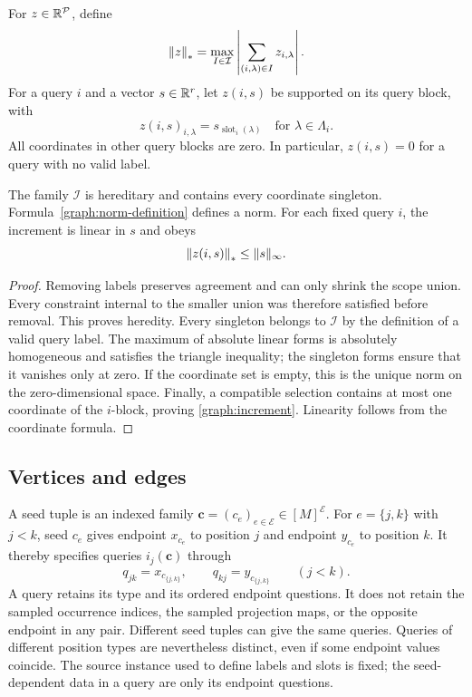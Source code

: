 For $z\in\mathbb R^{\mathcal P}$, define
\begin{equation}\label{graph:norm-definition}
 \left\|z\right\|_*=\max_{I\in\mathcal I}
       \left|\sum_{(i,\lambda)\in I}z_{i,\lambda}\right|.
\end{equation}
For a query $i$ and a vector $s\in\mathbb R^r$, let $z(i,s)$ be supported on
its query block, with
\[
 z(i,s)_{i,\lambda}=s_{\operatorname{slot}_i(\lambda)}
 \quad\text{for }\lambda\in\Lambda_i.
\]
All coordinates in other query blocks are zero.  In particular,
$z(i,s)=0$ for a query with no valid label.

\begin{lemma}\label{graph:norm}
The family $\mathcal I$ is hereditary and contains every coordinate
singleton.  Formula~\eqref{graph:norm-definition} defines a norm.
For each fixed query $i$, the increment is linear in $s$ and obeys
\begin{equation}\label{graph:increment}
 \left\|z(i,s)\right\|_*\leq\|s\|_\infty.
\end{equation}
\end{lemma}
\begin{proof}
Removing labels preserves agreement and can only shrink the scope
union.  Every constraint internal to the smaller union was therefore
satisfied before removal.  This proves heredity.  Every singleton
belongs to $\mathcal I$ by the definition of a valid query label.
The maximum of absolute linear forms is absolutely homogeneous and
satisfies the triangle inequality; the singleton forms ensure that
it vanishes only at zero.  If the coordinate set is empty, this is
the unique norm on the zero-dimensional space.  Finally, a compatible
selection contains at most one coordinate of the $i$-block, proving
\eqref{graph:increment}.  Linearity follows from the coordinate formula.
\end{proof}

\subsection{Vertices and edges}

A seed tuple is an indexed family
$\mathbf c=(c_e)_{e\in\mathcal E}\in[M]^{\mathcal E}$.
For $e=\{j,k\}$ with $j<k$, seed $c_e$ gives endpoint $x_{c_e}$ to
position $j$ and endpoint $y_{c_e}$ to position $k$.  It thereby
specifies queries $i_j(\mathbf c)$ through
\[
 q_{jk}=x_{c_{\{j,k\}}},\qquad
 q_{kj}=y_{c_{\{j,k\}}}\qquad(j<k).
\]
A query retains its type and its ordered endpoint questions.  It does
not retain the sampled occurrence indices, the sampled projection
maps, or the opposite endpoint in any pair.  Different seed tuples
can give the same queries.  Queries of different position types are
nevertheless distinct, even if some endpoint values coincide.
The source instance used to define labels and slots is fixed; the
seed-dependent data in a query are only its endpoint questions.

